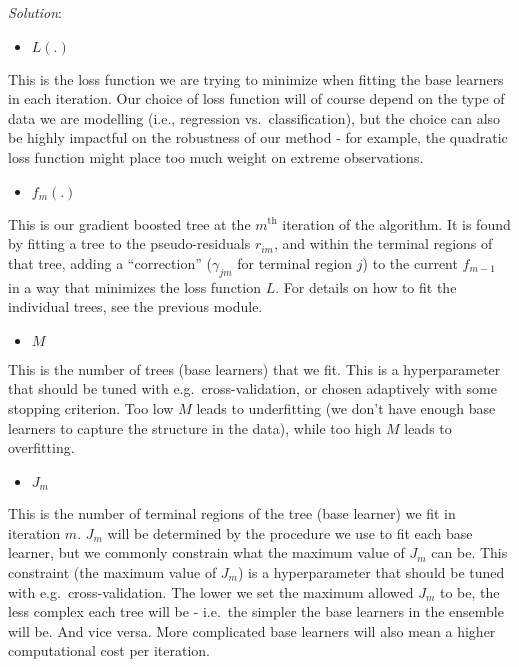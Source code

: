 \documentclass[
]{article}
\providecommand{\tightlist}{%
  \setlength{\itemsep}{0pt}\setlength{\parskip}{0pt}}
\begin{document}
\emph{Solution}:

\begin{itemize}
\tightlist
\item
  \(L(.)\)
\end{itemize}

This is the loss function we are trying to minimize when fitting the
base learners in each iteration. Our choice of loss function will of
course depend on the type of data we are modelling (i.e., regression
vs.~classification), but the choice can also be highly impactful on the
robustness of our method - for example, the quadratic loss function
might place too much weight on extreme observations.

\begin{itemize}
\tightlist
\item
  \(f_m(.)\)
\end{itemize}

This is our gradient boosted tree at the \(m^{\text{th}}\) iteration of
the algorithm. It is found by fitting a tree to the pseudo-residuals
\(r_{im}\), and within the terminal regions of that tree, adding a
``correction'' (\(\gamma_{jm}\) for terminal region \(j\)) to the
current \(f_{m-1}\) in a way that minimizes the loss function \(L\). For
details on how to fit the individual trees, see the previous module.

\begin{itemize}
\tightlist
\item
  \(M\)
\end{itemize}

This is the number of trees (base learners) that we fit. This is a
hyperparameter that should be tuned with e.g.~cross-validation, or
chosen adaptively with some stopping criterion. Too low \(M\) leads to
underfitting (we don't have enough base learners to capture the
structure in the data), while too high \(M\) leads to overfitting.

\begin{itemize}
\tightlist
\item
  \(J_m\)
\end{itemize}

This is the number of terminal regions of the tree (base learner) we fit
in iteration \(m\). \(J_m\) will be determined by the procedure we use
to fit each base learner, but we commonly constrain what the maximum
value of \(J_m\) can be. This constraint (the maximum value of \(J_m\))
is a hyperparameter that should be tuned with e.g.~cross-validation. The
lower we set the maximum allowed \(J_m\) to be, the less complex each
tree will be - i.e.~the simpler the base learners in the ensemble will
be. And vice versa. More complicated base learners will also mean a
higher computational cost per iteration.
\end{document}
